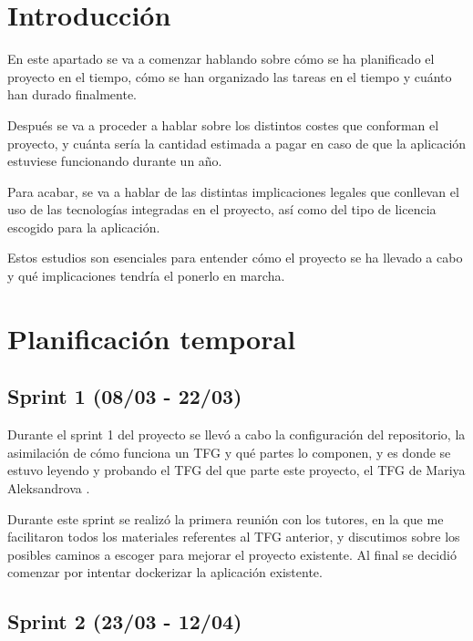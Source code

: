 
\section{Introducción}

En este apartado se va a comenzar hablando sobre cómo se ha planificado el proyecto en el tiempo, cómo se han organizado las tareas en el tiempo y cuánto han durado finalmente. 

Después se va a proceder a hablar sobre los distintos costes que conforman el proyecto, y cuánta sería la cantidad estimada a pagar en caso de que la aplicación estuviese funcionando durante un año.

Para acabar, se va a hablar de las distintas implicaciones legales que conllevan el uso de las tecnologías integradas en el proyecto, así como del tipo de licencia escogido para la aplicación.

Estos estudios son esenciales para entender cómo el proyecto se ha llevado a cabo y qué implicaciones tendría el ponerlo en marcha.

\section{Planificación temporal}

\subsection{Sprint 1 (08/03 - 22/03)}

Durante el sprint 1 del proyecto se llevó a cabo la configuración del repositorio, la asimilación de cómo funciona un TFG y qué partes lo componen, y es donde se estuvo leyendo y probando el TFG del que parte este proyecto, el TFG de Mariya Aleksandrova \cite{tfg-mariya:memoria}.

Durante este sprint se realizó la primera reunión con los tutores, en la que me facilitaron todos los materiales referentes al TFG anterior, y discutimos sobre los posibles caminos a escoger para mejorar el proyecto existente. Al final se decidió comenzar por intentar dockerizar la aplicación existente.


\subsection{Sprint 2 (23/03 - 12/04)}

